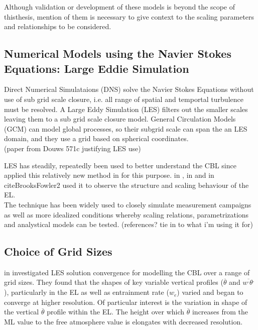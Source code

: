 Although validation or development of these models is beyond the scope of thisthesis, mention of them is necessary to give context to the scaling 
parameters and relationships to be considered. \\         

\subsection{Numerical Models using the Navier Stokes Equations: Large Eddie Simulation}

Direct Numerical Simulataions (\acs{DNS}) solve the Navier Stokes Equations without use of sub grid scale closure, i.e. all range of spatial
and temportal turbulence must be resolved.  A Large Eddy Simulation (\acs{LES}) filters out the smaller scales leaving them to 
a sub grid scale closure model.  General Circulation Models (\acs{GCM}) can model global processes, so their subgrid scale can span the
an LES domain, and they use a grid based on spherical coordinates.\\

(paper from Douws 571c justifying LES use)

\acs{LES} has steadily, repeatedly been used to better understand the \acs{CBL} since \citeauthor{Deardorff72} applied this relatively 
new method in \cite{Deardorff72} for this purpose.  \citeauthor{SullMoengStev} in \cite{SullMoengStev}, \citeauthor{FedConzMir04} in \cite{FedConzMir04}
and \citeauthor{BrooksFowler2} in cite{BrooksFowler2} used it to observe the structure and scaling behaviour of the \acs{EL}.\\

The technique has been widely used to closely simulate measurement campaigns as well as more idealized conditions whereby scaling relations, parametrizations
and analystical models can be tested. (references? tie in to what i'm using it for)
\\

\subsection{Choice of Grid Sizes}

\citeauthor{SullPat} in \cite{SullPat} investigated \acs{LES} solution convergence for modelling the \acs{CBL} over a range of grid sizes.
They found that the shapes of key variable vertical profiles ($\overline{\theta}$ and $\overline{w^{,}\theta^{,}}$), particularly in the \acs{EL} 
as well as entrainment rate ($w_{e}$) varied and began to converge at higher resolution.  Of particular interest is the variation
in shape of the vertical $\overline{\theta}$ profile within the \acs{EL}.  The height over which $\overline{\theta}$ increases
from the \acs{ML} value to the free atmosphere value is elongates with decreased resolution.\\

